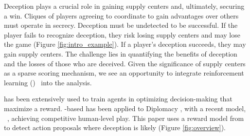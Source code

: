 Deception plays a crucial role in gaining supply centers and, ultimately, securing a win. Cliques of players agreeing to coordinate to gain advantages over others must operate in secrecy.  %
Deception must be undetected to be successful. If the player fails to recognize deception, they risk losing supply centers and may lose the game (Figure \ref{fig:intro_example}). If a player's deception succeeds, they may gain supply centers. The challenge lies in quantifying the benefits of deception and the losses of those who are deceived. Given the significance of supply centers as a sparse scoring mechanism, we see an opportunity to integrate reinforcement learning ()~\citep{zinkevich2007regret,brown2019deep} into the analysis.

 has been extensively used to train  agents in optimizing decision-making that maximize a reward. -based  has been applied to Diplomacy \cite{NEURIPS2019_84b20b1f,anthony2020learning,gray2020human,bakhtin2021nopress}, with a recent model, 
\cicero~\citep{meta2022human}, achieving competitive human-level play. This paper uses a reward model from \cicero to detect action proposals where deception is likely (Figure \ref{fig:overview}).

